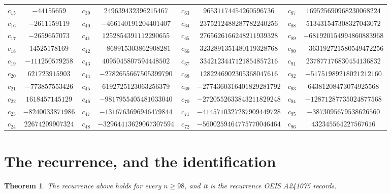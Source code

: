 \documentclass[11pt,a4paper]{article}
\theoremstyle{plain}
\newtheorem{theorem}{Theorem}
\theoremstyle{definition}
\begin{document}
\begin{center}
\begin{tabular}{cccccccc}
$c_{15}$ & $-44155659$ & $c_{39}$ & $249639432396215467$ & $c_{63}$ & $96531174454260596736$ & $c_{87}$ & $169525690968230068224$ \\
$c_{16}$ & $-2611159119$ & $c_{40}$ & $-466140191204401407$ & $c_{64}$ & $2375212488287782240256$ & $c_{88}$ & $513431547308327043072$ \\
$c_{17}$ & $-2659657073$ & $c_{41}$ & $1252854391112290655$ & $c_{65}$ & $2765626166248211939328$ & $c_{89}$ & $-681920154994860883968$ \\
$c_{18}$ & $14525178169$ & $c_{42}$ & $-868915303862908281$ & $c_{66}$ & $3232891351480119328768$ & $c_{90}$ & $-363192721580549472256$ \\
$c_{19}$ & $-111250579258$ & $c_{43}$ & $4095045807594448502$ & $c_{67}$ & $3342123447121854857216$ & $c_{91}$ & $237877176830454136832$ \\
$c_{20}$ & $621723915903$ & $c_{44}$ & $-2782655667505399790$ & $c_{68}$ & $1282246902305368047616$ & $c_{92}$ & $-51751989218021212160$ \\
$c_{21}$ & $-773857553426$ & $c_{45}$ & $6192725123063256379$ & $c_{69}$ & $-2774360316401829281792$ & $c_{93}$ & $64381208473074925568$ \\
$c_{22}$ & $1618457145129$ & $c_{46}$ & $-9817955405481033040$ & $c_{70}$ & $-2720552633843211829248$ & $c_{94}$ & $-12871287735024877568$ \\
$c_{23}$ & $-8240033871986$ & $c_{47}$ & $-1316763696946479844$ & $c_{71}$ & $-4145710327287909449728$ & $c_{95}$ & $-3873095679538626560$ \\
$c_{24}$ & $22674209907324$ & $c_{48}$ & $-32964413629067307594$ & $c_{72}$ & $-5600259464775770046464$ & $c_{96}$ & $432345564227567616$ \\
\end{tabular}
\end{center}

\section{The recurrence, and the identification}

\begin{theorem}
The recurrence above holds for every $n\ge98$, and it is the recurrence OEIS A241075 records.
\end{theorem}
\end{document}
